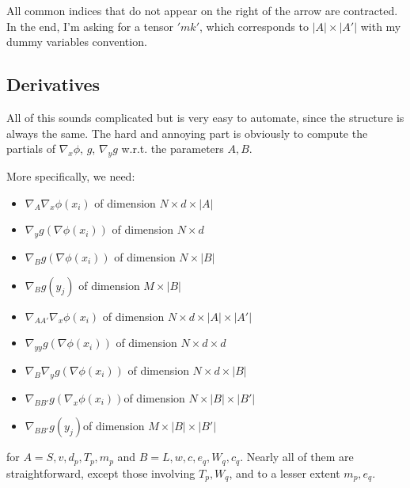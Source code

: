 \documentclass{article}
\theoremstyle{definition}
\theoremstyle{remark}
\newcommand{\1}{\mathbbm{1}}
\begin{document}
All common indices that do not appear on the right of the arrow are contracted. In the end, I'm asking for a tensor $'mk'$, which corresponds to $|A| \times |A'|$ with my dummy variables convention.

\subsection{Derivatives}
All of this sounds complicated but is very easy to automate, since the structure is always the same. The hard and annoying part is obviously to compute the partials of $\nabla_x \phi$, $g$, $\nabla_y g$ w.r.t. the parameters $A,B$.

More specifically, we need:
\begin{itemize}
\item $\nabla_A \nabla_x \phi(x_i)$ of dimension $N \times d \times |A|$
\item $\nabla_y g(\nabla \phi(x_i))$ of dimension $N \times d$
\item $\nabla_B g(\nabla \phi(x_i))$ of dimension $N \times |B|$
\item $\nabla_B g(y_j)$ of dimension $M \times |B|$
\item $\nabla_{AA'} \nabla_x \phi(x_i)$ of dimension $N \times d \times |A| \times |A'|$
\item $\nabla_{yy} g(\nabla \phi(x_i))$ of dimension $N \times d \times d$
\item $\nabla_B \nabla_y g(\nabla \phi(x_i))$ of dimension $N \times d\times |B|$
\item $\nabla_{BB'} g(\nabla_x \phi(x_i))$of dimension $N \times |B| \times |B'|$
\item $\nabla_{BB'} g(y_j)$of dimension $M \times |B| \times |B'|$
\end{itemize}
for $A = S,v,d_p, T_p, m_p$ and $B=L,w,c,e_q,W_q,c_q$. Nearly all of them are straightforward, except those involving $T_p,W_q$, and to a lesser extent $m_p,e_q$.
\end{document}
